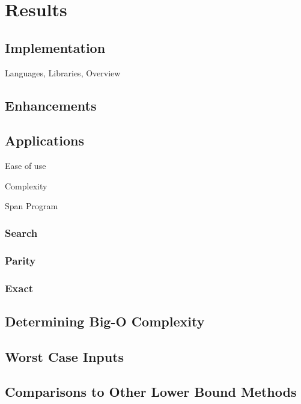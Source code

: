 \section{Results}
\subsection{Implementation}
Languages, Libraries, Overview
\subsection{Enhancements}
\subsection{Applications}

Ease of use

Complexity

Span Program

\subsubsection{Search}
\subsubsection{Parity}
\subsubsection{Exact}
\subsection{Determining Big-O Complexity}
\subsection{Worst Case Inputs}
\subsection{Comparisons to Other Lower Bound Methods}